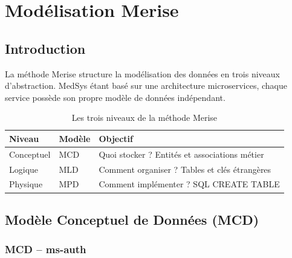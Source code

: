 \chapter{Modélisation Merise}

\section{Introduction}

La méthode Merise structure la modélisation des données en trois niveaux d'abstraction.
MedSys étant basé sur une architecture microservices, chaque service possède son propre
modèle de données indépendant.

\begin{table}[H]
\centering
\renewcommand{\arraystretch}{1.3}
\begin{tabular}{|l|l|l|}
\hline
\rowcolor{tabhead}\color{white}\textbf{Niveau} &
\color{white}\textbf{Modèle} &
\color{white}\textbf{Objectif} \\
\hline
Conceptuel & MCD & Quoi stocker ? Entités et associations métier \\
\rowcolor{roweven}
Logique    & MLD & Comment organiser ? Tables et clés étrangères \\
Physique   & MPD & Comment implémenter ? SQL CREATE TABLE \\
\hline
\end{tabular}
\caption{Les trois niveaux de la méthode Merise}
\end{table}

\section{Modèle Conceptuel de Données (MCD)}

\subsection{MCD -- ms-auth}

